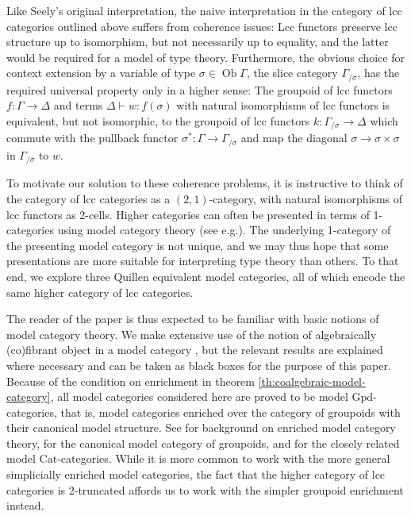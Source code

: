 \documentclass[a4paper]{article}
\theoremstyle{remark}
\theoremstyle{definition}
\begin{document}
Like Seely's original interpretation, the naive interpretation in the category of lcc categories outlined above suffers from coherence issues:
Lcc functors preserve lcc structure up to isomorphism, but not necessarily up to equality, and the latter would be required for a model of type theory.
Furthermore, the obvious choice for context extension by a variable of type $\sigma \in \operatorname{Ob} \Gamma$, the slice category $\Gamma_{/ \sigma}$, has the required universal property only in a higher sense:
The groupoid of lcc functors $f : \Gamma \rightarrow \Delta$ and terms $\Delta \vdash w : f(\sigma)$ with natural isomorphisms of lcc functors is equivalent, but not isomorphic, to the groupoid of lcc functors $k : \Gamma_{/ \sigma} \rightarrow \Delta$ which commute with the pullback functor $\sigma^* : \Gamma \rightarrow \Gamma_{/ \sigma}$ and map the diagonal $\sigma \rightarrow \sigma \times \sigma$ in $\Gamma_{/ \sigma}$ to $w$.

To motivate our solution to these coherence problems, it is instructive to think of the category of lcc categories as a $(2, 1)$-category, with natural isomorphisms of lcc functors as 2-cells.
Higher categories can often be presented in terms of 1-categories using model category theory (see e.g.\@ \citet{hirschhorn}).
The underlying 1-category of the presenting model category is not unique, and we may thus hope that some presentations are more suitable for interpreting type theory than others.
To that end, we explore three Quillen equivalent model categories, all of which encode the same higher category of lcc categories.

The reader of the paper is thus expected to be familiar with basic notions of model category theory.
We make extensive use of the notion of algebraically (co)fibrant object in a model category \citep{algebraic-models,coalgebraic-models}, but the relevant results are explained where necessary and can be taken as black boxes for the purpose of this paper.
Because of the condition on enrichment in theorem \ref{th:coalgebraic-model-category}, all model categories considered here are proved to be model $\mathrm{Gpd}$-categories, that is, model categories enriched over the category of groupoids with their canonical model structure.
See \citet{enriched-model-cats} for background on enriched model category theory, \citet{groupoid-model-cat} for the canonical model category of groupoids, and \citet{homotopy-theoretic-aspects} for the closely related model $\mathrm{Cat}$-categories.
While it is more common to work with the more general simplicially enriched model categories, the fact that the higher category of lcc categories is 2-truncated affords us to work with the simpler groupoid enrichment instead.
\end{document}
